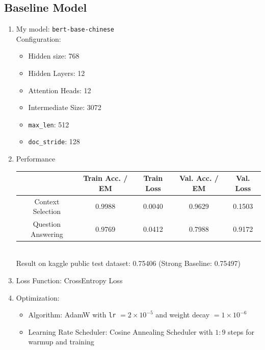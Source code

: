 \documentclass{homeworg}
\newcommand{\hug}{\emoji{hugs}\phantom{x}}
\begin{document}
\subsection{Baseline Model}
\begin{enumerate}
    \item My model: \hug \texttt{bert-base-chinese} \\
    Configuration:
    \begin{itemize}
        \item Hidden size: 768
        \item Hidden Layers: 12
        \item Attention Heads: 12
        \item Intermediate Size: 3072
        \item \texttt{max\_len}: 512
        \item \texttt{doc\_stride}: 128
    \end{itemize}
    \item Performance\\
        \begin{tabular}{c|c|c|c|c}
            & Train Acc. / EM & Train Loss & Val. Acc. / EM & Val. Loss \\ 
            \hline Context Selection & 0.9988  & 0.0040 & 0.9629 & 0.1503 \\
            \hline Question Answering & 0.9769  & 0.0412 & 0.7988 & 0.9172
        \end{tabular}\vspace{10pt}\\ 
        Result on kaggle public test dataset:
        0.75406 (Strong Baseline: 0.75497)
    \item Loss Function: CrossEntropy Loss 
    \item Optimization:
    \begin{itemize}
        \item Algorithm: AdamW with \texttt{lr} $ = 2\times10^{-5}$ and weight decay $= 1 \times 10^{-6}$
        \item Learning Rate Scheduler: Cosine Annealing Scheduler with $1:9$ steps for warmup and training
    \end{itemize}
\end{enumerate}
\end{document}
